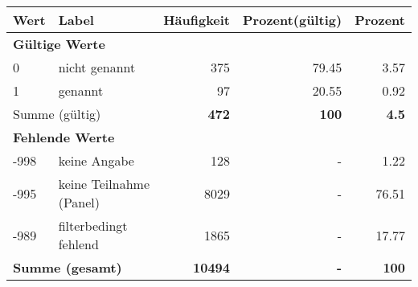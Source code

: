      \begin{longtable}{lXrrr}
     \toprule
     \textbf{Wert} & \textbf{Label} & \textbf{Häufigkeit} & \textbf{Prozent(gültig)} & \textbf{Prozent} \\
     \endhead
     \midrule
     \multicolumn{5}{l}{\textbf{Gültige Werte}}\\

     0 &
     \multicolumn{1}{X}{ nicht genannt   } &


       \num{375} &
       \num[round-mode=places,round-precision=2]{79,45} &
         \num[round-mode=places,round-precision=2]{3,57} \\

     1 &
     \multicolumn{1}{X}{ genannt   } &


       \num{97} &
       \num[round-mode=places,round-precision=2]{20,55} &
         \num[round-mode=places,round-precision=2]{0,92} \\
     \midrule
     \multicolumn{2}{l}{Summe (gültig)} &
       \textbf{\num{472}} &
     \textbf{100} &
       \textbf{\num[round-mode=places,round-precision=2]{4,5}} \\
     \multicolumn{5}{l}{\textbf{Fehlende Werte}}\\
       -998 &
       keine Angabe &
         \num{128} &
        - &
         \num[round-mode=places,round-precision=2]{1,22} \\
       -995 &
       keine Teilnahme (Panel) &
         \num{8029} &
        - &
         \num[round-mode=places,round-precision=2]{76,51} \\
       -989 &
       filterbedingt fehlend &
         \num{1865} &
        - &
         \num[round-mode=places,round-precision=2]{17,77} \\
     \midrule
     \multicolumn{2}{l}{\textbf{Summe (gesamt)}} &
          \textbf{\num{10494}} &
        \textbf{-} &
        \textbf{100} \\
     \bottomrule
     \end{longtable}
     
